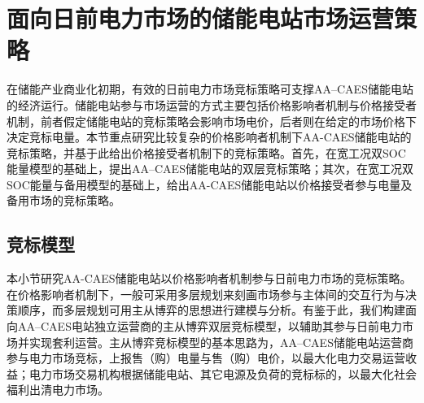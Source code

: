 

\section{面向日前电力市场的储能电站市场运营策略}
\label{sec:chap3-bid-aa-caes}
在储能产业商业化初期，有效的日前电力市场竞标策略可支撑AA–CAES储能电站的经济运行\cite{CAES-DAM-Rui-18}。储能电站参与市场运营的方式主要包括价格影响者机制与价格接受者机制，前者假定储能电站的竞标策略会影响市场电价，后者则在给定的市场价格下决定竞标电量\cite{CAES-DAM-Rui-18}。本节重点研究比较复杂的价格影响者机制下AA-CAES储能电站的竞标策略，并基于此给出价格接受者机制下的竞标策略。首先，在宽工况双SOC能量模型的基础上，提出AA–CAES储能电站的双层竞标策略；其次，在宽工况双SOC能量与备用模型的基础上，给出AA-CAES储能电站以价格接受者参与电量及备用市场的竞标策略。

\subsection{竞标模型}
\label{sec:chap3-bid-aa-caes-game}
本小节研究AA-CAES储能电站以价格影响者机制参与日前电力市场的竞标策略。在价格影响者机制下，一般可采用多层规划来刻画市场参与主体间的交互行为与决策顺序，而多层规划可用主从博弈的思想进行建模与分析\cite{Game-Mei-16}。有鉴于此，我们构建面向AA–CAES电站独立运营商的主从博弈双层竞标模型，以辅助其参与日前电力市场并实现套利运营。主从博弈竞标模型的基本思路为，AA–CAES储能电站运营商参与电力市场竞标，上报售（购）电量与售（购）电价，以最大化电力交易运营收益；电力市场交易机构根据储能电站、其它电源及负荷的竞标标的，以最大化社会福利出清电力市场。



